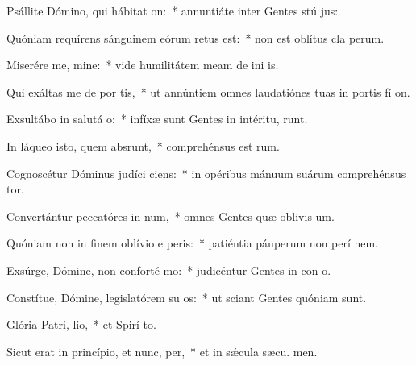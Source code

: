 \item Psállite Dómino, qui hábitat  on:~* annuntiáte inter Gentes stú jus:
\item Quóniam requírens sánguinem eórum retus est:~* non est oblítus cla perum.
\item Miserére me, mine:~* vide humilitátem meam de ini is.
\item Qui exáltas me de por tis,~* ut annúntiem omnes laudatiónes tuas in portis fí on.
\item Exsultábo in salutá o:~* infíxæ sunt Gentes in intéritu,  runt.
\item In láqueo isto, quem absrunt,~* comprehénsus est  rum.
\item Cognoscétur Dóminus judíci ciens:~* in opéribus mánuum suárum comprehénsus  tor.
\item Convertántur peccatóres in num,~* omnes Gentes quæ oblivis um.
\item Quóniam non in finem oblívio e peris:~* patiéntia páuperum non perí  nem.
\item Exsúrge, Dómine, non conforté mo:~* judicéntur Gentes in con o.
\item Constítue, Dómine, legislatórem su os:~* ut sciant Gentes quóniam  sunt.
\item Glória Patri,  lio,~* et Spirí to.
\item Sicut erat in princípio, et nunc,  per,~* et in sǽcula sæcu. men.
